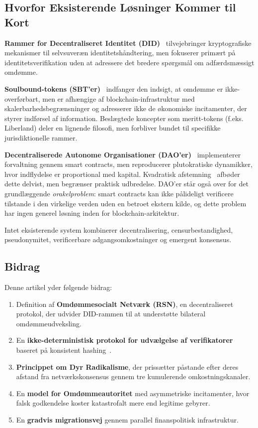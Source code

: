 \documentclass[11pt,a4paper,twocolumn]{article}
\begin{document}
\subsection{Hvorfor Eksisterende Løsninger Kommer til Kort}

\textbf{Rammer for Decentraliseret Identitet (DID)}~\cite{did2022} tilvejebringer kryptografiske mekanismer til selvsuveræn identitetshåndtering, men fokuserer primært på identitetsverifikation uden at adressere det bredere spørgsmål om adfærdsmæssigt omdømme.

\textbf{Soulbound-tokens (SBT'er)}~\cite{weyl2022} indfanger den indsigt, at omdømme er ikke-overførbart, men er afhængige af blockchain-infrastruktur med skalerbarhedsbegrænsninger og adresserer ikke de økonomiske incitamenter, der styrer indførsel af information. Beslægtede koncepter som meritt-tokens (f.eks. Liberland) deler en lignende filosofi, men forbliver bundet til specifikke jurisdiktionelle rammer.

\textbf{Decentraliserede Autonome Organisationer (DAO'er)}~\cite{buterin2014} implementerer forvaltning gennem smart contracts, men reproducerer plutokratiske dynamikker, hvor indflydelse er proportional med kapital. Kvadratisk afstemning~\cite{buterin2019} afbøder dette delvist, men begrænser praktisk udbredelse. DAO'er står også over for det grundlæggende \emph{orakelproblem}: smart contracts kan ikke pålideligt verificere tilstande i den virkelige verden uden en betroet ekstern kilde, og dette problem har ingen generel løsning inden for blockchain-arkitektur.

Intet eksisterende system kombinerer decentralisering, censurbestandighed, pseudonymitet, verificerbare adgangsomkostninger og emergent konsensus.

\subsection{Bidrag}

Denne artikel yder følgende bidrag:
\begin{enumerate}[nosep]
\item Definition af \textbf{Omdømmesocialt Netværk (RSN)}, en decentraliseret protokol, der udvider DID-rammen til at understøtte bilateral omdømmeudveksling.
\item En \textbf{ikke-deterministisk protokol for udvælgelse af verifikatorer} baseret på konsistent hashing~\cite{karger1997}.
\item \textbf{Princippet om Dyr Radikalisme}, der prissætter påstande efter deres afstand fra netværkskonsensus gennem tre kumulerende omkostningskanaler.
\item En \textbf{model for Omdømmeautoritet} med asymmetriske incitamenter, hvor falsk godkendelse koster katastrofalt mere end legitime gebyrer.
\item En \textbf{gradvis migrationsvej} gennem parallel finanspolitisk infrastruktur.
\end{enumerate}
\end{document}
